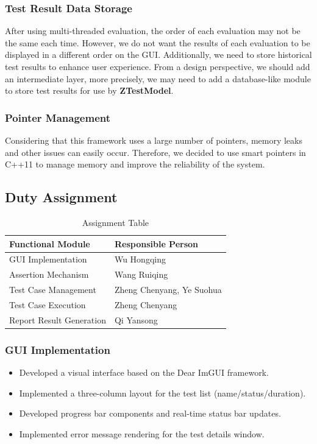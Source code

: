 \documentclass[english]{article}
\begin{document}
\subsubsection{Test Result Data Storage}
After using multi-threaded evaluation, the order of each evaluation may not be the same each time. However, we do not want the results of each evaluation to be displayed in a different order on the GUI. Additionally, we need to store historical test results to enhance user experience. From a design perspective, we should add an intermediate layer, more precisely, we may need to add a database-like module to store test results for use by \textbf{ZTestModel}.
\subsubsection{Pointer Management}
Considering that this framework uses a large number of pointers, memory leaks and other issues can easily occur. Therefore, we decided to use smart pointers in C++11 to manage memory and improve the reliability of the system.
\subsection{Duty Assignment}
\begin{table}[H]
    \centering
    \caption{Assignment Table}
    \begin{tabular}{l>{\centering\arraybackslash}p{5cm}} %
        \toprule %
        \textbf{Functional Module} & \textbf{Responsible Person} \\ %
        \midrule
        GUI Implementation         & Wu Hongqing                 \\
        Assertion Mechanism        & Wang Ruiqing                \\
        Test Case Management       & Zheng Chenyang, Ye Suohua   \\
        Test Case Execution        & Zheng Chenyang              \\
        Report Result Generation   & Qi Yansong                  \\
        \bottomrule %
    \end{tabular}
\end{table}
\subsubsection*{GUI Implementation}
\begin{itemize}[leftmargin=1em,itemsep=0.5ex]
    \item Developed a visual interface based on the Dear ImGUI framework.
    \item Implemented a three-column layout for the test list (name/status/duration).
    \item Developed progress bar components and real-time status bar updates.
    \item Implemented error message rendering for the test details window.
\end{itemize}
\end{document}
